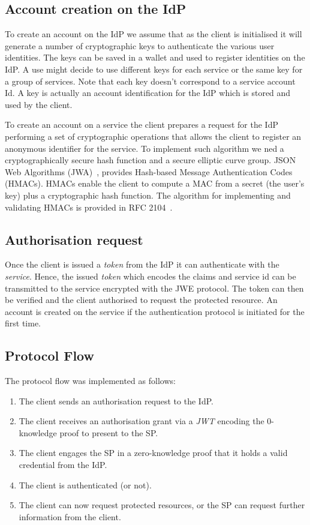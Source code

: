 \subsection{Account creation on the IdP}

To create an account on the IdP we assume that as the client is initialised it will generate a number of cryptographic keys to authenticate the various user identities. The keys can be saved in a wallet and used to register identities on the IdP. A use might decide to use different keys for each service or the same key for a group of services. Note that each key doesn't correspond to a service account Id. A key is actually an account identification for the IdP which is stored and used by the client.

To create an account on a service the client prepares a request for the IdP performing a set of cryptographic operations that allows the client to register an anonymous identifier for the service. To implement such algorithm we ned a
cryptographically secure hash function and a secure elliptic curve group. JSON Web Algorithms (JWA)~\cite{jones2015jwa}, provides Hash-based Message Authentication Codes (HMACs). HMACs enable the client to compute a MAC from a secret (the user's key) plus a cryptographic hash function. The algorithm for implementing and validating HMACs is provided in RFC 2104~\cite{krawczyk1997rfc}.

\subsection{Authorisation request}

Once the client is issued a \emph{token} from the IdP it can authenticate with the \emph{service}. Hence, the issued \emph{token} which encodes the claims and service id can be transmitted to the service encrypted with the JWE protocol. The token can then be verified and the client authorised to request the protected resource. An account is created on the service if the authentication protocol is initiated for the first time.

\subsection{Protocol Flow}

The protocol flow was implemented as follows:
\begin{enumerate}
    \item The client sends an authorisation request to the IdP.
    \item The client receives an authorisation grant via a \emph{JWT} encoding the 0-knowledge proof to present to the SP.
    \item The client engages the SP in a zero-knowledge proof that it holds a valid credential from the IdP.
    \item The client is authenticated (or not).
    \item The client can now request protected resources, or the SP can request further information from the client.
\end{enumerate}


